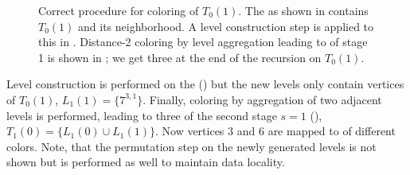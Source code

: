 \begin{figure}[t]
     	\centering
     	\hspace{0.6em}
     	\hspace{0.6em}
     	\hspace{0.6em}
     	\hspace{0.6em}
     	\caption{Correct procedure for \DTWO coloring of \levelGroup $T_0(1)$. The \subgraph as shown in  contains \levelGroup $T_0(1)$ and its \DONE neighborhood. A level construction step is applied to this \subgraph in . Distance-2 coloring by level aggregation leading to \levelGroups of stage 1 is shown in ; we get three \levelGroups at the end of the recursion on $T_0(1)$.}
     	\label{fig:rec_d2_correct}
     \end{figure}
Level construction is performed on the \subgraph () but the new levels only contain vertices of  $T_0(1)$, \ie $L_1(1) = \{7^{3,1}\}$. Finally, \DTWO coloring by aggregation of two adjacent levels is performed, leading to three \levelGroups of the second stage $s=1$ (), \ie $T_1(0)=\{L_1(0) \cup L_1(1)\}$.  Now vertices $3$ and $6$ are mapped to \levelGroups of different colors. Note, that the permutation step on the newly generated levels is not shown but is performed as well to maintain data locality. 
    
